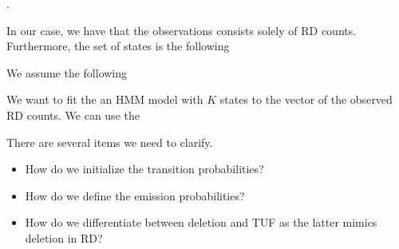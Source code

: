 .


In our case, we have that the observations consists solely of RD counts. Furthermore, the set of states is the following



We assume the following


We want to fit the an HMM model with $K$ states to the vector of the observed RD counts. We can use the 



There are several items we need to clarify. 

\begin{itemize}
\item How do we initialize the transition probabilities?
\item How do we define the emission probabilities?
\item How do we differentiate between deletion and TUF as the latter mimics deletion in RD?
\end{itemize}


